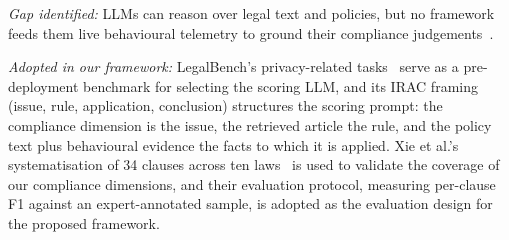 \documentclass[conference]{IEEEtran}
\begin{document}
\noindent\textit{Gap identified:} LLMs can reason over legal text and policies, but no framework feeds them live behavioural telemetry to ground their compliance judgements~\cite{guha-2023-legalbench,xie-2025-llmpolicy}.

\noindent\textit{Adopted in our framework:} LegalBench's privacy-related tasks~\cite{guha-2023-legalbench} serve as a pre-deployment benchmark for selecting the scoring LLM, and its IRAC framing (issue, rule, application, conclusion) structures the scoring prompt: the compliance dimension is the issue, the retrieved article the rule, and the policy text plus behavioural evidence the facts to which it is applied. Xie et al.'s systematisation of 34 clauses across ten laws~\cite{xie-2025-llmpolicy} is used to validate the coverage of our compliance dimensions, and their evaluation protocol, measuring per-clause F1 against an expert-annotated sample, is adopted as the evaluation design for the proposed framework.
\end{document}
